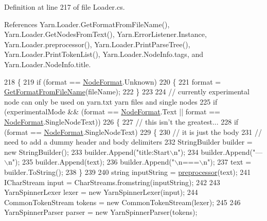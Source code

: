 Definition at line 217 of file Loader.\-cs.



References Yarn.\-Loader.\-Get\-Format\-From\-File\-Name(), Yarn.\-Loader.\-Get\-Nodes\-From\-Text(), Yarn.\-Error\-Listener.\-Instance, Yarn.\-Loader.\-preprocessor(), Yarn.\-Loader.\-Print\-Parse\-Tree(), Yarn.\-Loader.\-Print\-Token\-List(), Yarn.\-Loader.\-Node\-Info.\-tags, and Yarn.\-Loader.\-Node\-Info.\-title.


\begin{DoxyCode}
218         \{
219             \textcolor{keywordflow}{if} (format == \hyperlink{a00045_ad7ebb46e7309ead8767383a672b3272f}{NodeFormat}.Unknown)
220             \{
221                 format = \hyperlink{a00127_a080b2d6b7553c178007c04297d50e9da}{GetFormatFromFileName}(fileName);
222             \}
223 
224             \textcolor{comment}{// currently experimental node can only be used on yarn.txt yarn files and single nodes}
225             \textcolor{keywordflow}{if} (experimentalMode && (format == \hyperlink{a00045_ad7ebb46e7309ead8767383a672b3272f}{NodeFormat}.Text || format == 
      \hyperlink{a00045_ad7ebb46e7309ead8767383a672b3272f}{NodeFormat}.SingleNodeText))
226             \{
227                 \textcolor{comment}{// this isn't the greatest...}
228                 \textcolor{keywordflow}{if} (format == \hyperlink{a00045_ad7ebb46e7309ead8767383a672b3272f}{NodeFormat}.SingleNodeText)
229                 \{
230                     \textcolor{comment}{// it is just the body}
231                     \textcolor{comment}{// need to add a dummy header and body delimiters}
232                     StringBuilder builder = \textcolor{keyword}{new} StringBuilder();
233                     builder.Append(\textcolor{stringliteral}{"title:Start\(\backslash\)n"});
234                     builder.Append(\textcolor{stringliteral}{"---\(\backslash\)n"});
235                     builder.Append(text);
236                     builder.Append(\textcolor{stringliteral}{"\(\backslash\)n===\(\backslash\)n"});
237                     text = builder.ToString();
238                 \}
239 
240                 \textcolor{keywordtype}{string} inputString = \hyperlink{a00127_a0b09a29edd2ed13d52203f1b71a47081}{preprocessor}(text);
241                 ICharStream input = CharStreams.fromstring(inputString);
242 
243                 YarnSpinnerLexer lexer = \textcolor{keyword}{new} YarnSpinnerLexer(input);
244                 CommonTokenStream tokens = \textcolor{keyword}{new} CommonTokenStream(lexer);
245 
246                 YarnSpinnerParser parser = \textcolor{keyword}{new} YarnSpinnerParser(tokens);

\end{DoxyCode}
